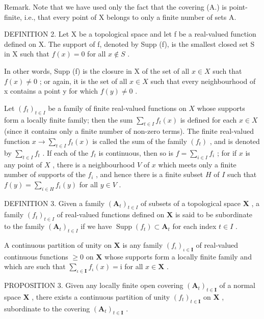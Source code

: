 Remark. Note that we have used only the fact that the covering (A.) is point-finite, i.e., that every point of X belongs to only a finite number of sets A.

DEFINITION 2. Let X be a topological space and let f be a real-valued function defined on X. The support of f, denoted by Supp (f), is the smallest closed set S in X such that \(f(x) = 0\) for all \(x \notin S\) .

In other words, Supp (f) is the closure in X of the set of all \(x \in X\) such that \(f(x) \neq 0\) ; or again, it is the set of all \(x \in X\) such that every neighbourhood of x contains a point y for which \(f(y) \neq 0\) .

Let \((f_{t})_{t\in I}\) be a family of finite real-valued functions on \(X\) whose supports form a locally finite family; then the sum \(\sum_{t\in I}f_t(x)\) is defined for each \(x\in X\) (since it contains only a finite number of non-zero terms). The finite real-valued function \(x\to \sum_{t\in I}f_t(x)\) is called the sum of the family \((f_{t})\) , and is denoted by \(\sum_{t\in I}f_{t}\) . If each of the \(f_{t}\) is continuous, then so is \(f = \sum_{i \in I} f_i\) ; for if \(x\) is any point of \(X\) , there is a neighbourhood \(V\) of \(x\) which meets only a finite number of supports of the \(f_i\) , and hence there is a finite subset \(H\) of \(I\) such that \(f(y) = \sum_{i \in H} f_i(y)\) for all \(y \in V\) .

DEFINITION 3. Given a family \((\mathbf{A}_{t})_{t\in I}\) of subsets of a topological space \(\mathbf{X}\) , a family \((f_t)_{t\in I}\) of real-valued functions defined on \(\mathbf{X}\) is said to be subordinate to the family \((\mathbf{A}_t)_{t\in I}\) if we have \(\operatorname{Supp}(f_t)\subset \mathbf{A}_t\) for each index \(t\in I\) .

A continuous partition of unity on \(\mathbf{X}\) is any family \((f_{\iota})_{\iota \in \mathbf{I}}\) of real-valued continuous functions \(\geqslant 0\) on \(\mathbf{X}\) whose supports form a locally finite family and which are such that \(\sum_{\iota \in \mathbf{I}} f_{\iota}(x) = \mathrm{i}\) for all \(x \in \mathbf{X}\) .

PROPOSITION 3. Given any locally finite open covering \((\mathbf{A}_t)_{t \in \mathbf{I}}\) of a normal space \(\mathbf{X}\) , there exists a continuous partition of unity \((f_t)_{t \in \mathbf{I}}\) on \(\mathbf{X}\) , subordinate to the covering \((\mathbf{A}_t)_{t \in \mathbf{I}}\) .

